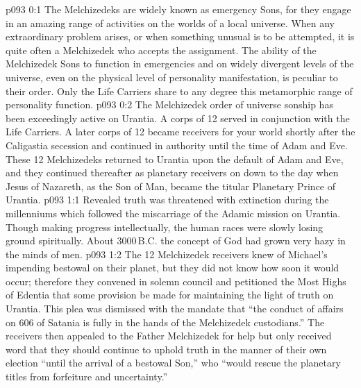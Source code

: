 \author{Melchizedek}
\vs p093 0:1 The Melchizedeks are widely known as emergency Sons, for they engage in an amazing range of activities on the worlds of a local universe. When any extraordinary problem arises, or when something unusual is to be attempted, it is quite often a Melchizedek who accepts the assignment. The ability of the Melchizedek Sons to function in emergencies and on widely divergent levels of the universe, even on the physical level of personality manifestation, is peculiar to their order. Only the Life Carriers share to any degree this metamorphic range of personality function.
\vs p093 0:2 \pc The Melchizedek order of universe sonship has been exceedingly active on Urantia. A corps of 12 served in conjunction with the Life Carriers. A later corps of 12 became receivers for your world shortly after the Caligastia secession and continued in authority until the time of Adam and Eve. These 12 Melchizedeks returned to Urantia upon the default of Adam and Eve, and they continued thereafter as planetary receivers on down to the day when Jesus of Nazareth, as the Son of Man, became the titular Planetary Prince of Urantia.
\vs p093 1:1 Revealed truth was threatened with extinction during the millenniums which followed the miscarriage of the Adamic mission on Urantia. Though making progress intellectually, the human races were slowly losing ground spiritually. About 3000\,B.C. the concept of God had grown very hazy in the minds of men.
\vs p093 1:2 The 12 Melchizedek receivers knew of Michael’s impending bestowal on their planet, but they did not know how soon it would occur; therefore they convened in solemn council and petitioned the Most Highs of Edentia that some provision be made for maintaining the light of truth on Urantia. This plea was dismissed with the mandate that “the conduct of affairs on 606 of Satania is fully in the hands of the Melchizedek custodians.” The receivers then appealed to the Father Melchizedek for help but only received word that they should continue to uphold truth in the manner of their own election “until the arrival of a bestowal Son,” who “would rescue the planetary titles from forfeiture and uncertainty.”
